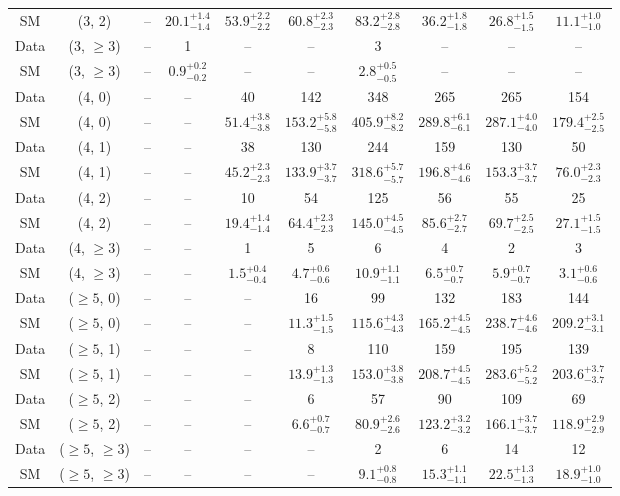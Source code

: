 \begin{table}[h!]
{\begin{tabular}{cccccccccc}
	SM & (3, 2) & -- & $20.1^{+ 1.4 }_{- 1.4 }$ & $53.9^{+ 2.2 }_{- 2.2 }$ & $60.8^{+ 2.3 }_{- 2.3 }$ & $83.2^{+ 2.8 }_{- 2.8 }$ & $36.2^{+ 1.8 }_{- 1.8 }$ & $26.8^{+ 1.5 }_{- 1.5 }$ & $11.1^{+ 1.0 }_{- 1.0 }$ \\[0.5ex] 
	Data & (3, $\ge3$) & -- & 1 & -- & -- & 3 & -- & -- & -- \\[0.5ex] 
	SM & (3, $\ge3$) & -- & $0.9^{+ 0.2 }_{- 0.2 }$ & -- & -- & $2.8^{+ 0.5 }_{- 0.5 }$ & -- & -- & -- \\[0.5ex] 
	Data & (4, 0) & -- & -- & 40 & 142 & 348 & 265 & 265 & 154 \\[0.5ex] 
	SM & (4, 0) & -- & -- & $51.4^{+ 3.8 }_{- 3.8 }$ & $153.2^{+ 5.8 }_{- 5.8 }$ & $405.9^{+ 8.2 }_{- 8.2 }$ & $289.8^{+ 6.1 }_{- 6.1 }$ & $287.1^{+ 4.0 }_{- 4.0 }$ & $179.4^{+ 2.5 }_{- 2.5 }$ \\[0.5ex] 
	Data & (4, 1) & -- & -- & 38 & 130 & 244 & 159 & 130 & 50 \\[0.5ex] 
	SM & (4, 1) & -- & -- & $45.2^{+ 2.3 }_{- 2.3 }$ & $133.9^{+ 3.7 }_{- 3.7 }$ & $318.6^{+ 5.7 }_{- 5.7 }$ & $196.8^{+ 4.6 }_{- 4.6 }$ & $153.3^{+ 3.7 }_{- 3.7 }$ & $76.0^{+ 2.3 }_{- 2.3 }$ \\[0.5ex] 
	Data & (4, 2) & -- & -- & 10 & 54 & 125 & 56 & 55 & 25 \\[0.5ex] 
	SM & (4, 2) & -- & -- & $19.4^{+ 1.4 }_{- 1.4 }$ & $64.4^{+ 2.3 }_{- 2.3 }$ & $145.0^{+ 4.5 }_{- 4.5 }$ & $85.6^{+ 2.7 }_{- 2.7 }$ & $69.7^{+ 2.5 }_{- 2.5 }$ & $27.1^{+ 1.5 }_{- 1.5 }$ \\[0.5ex] 
	Data & (4, $\ge3$) & -- & -- & 1 & 5 & 6 & 4 & 2 & 3 \\[0.5ex] 
	SM & (4, $\ge3$) & -- & -- & $1.5^{+ 0.4 }_{- 0.4 }$ & $4.7^{+ 0.6 }_{- 0.6 }$ & $10.9^{+ 1.1 }_{- 1.1 }$ & $6.5^{+ 0.7 }_{- 0.7 }$ & $5.9^{+ 0.7 }_{- 0.7 }$ & $3.1^{+ 0.6 }_{- 0.6 }$ \\[0.5ex] 
	Data & ($\ge5$, 0) & -- & -- & -- & 16 & 99 & 132 & 183 & 144 \\[0.5ex] 
	SM & ($\ge5$, 0) & -- & -- & -- & $11.3^{+ 1.5 }_{- 1.5 }$ & $115.6^{+ 4.3 }_{- 4.3 }$ & $165.2^{+ 4.5 }_{- 4.5 }$ & $238.7^{+ 4.6 }_{- 4.6 }$ & $209.2^{+ 3.1 }_{- 3.1 }$ \\[0.5ex] 
	Data & ($\ge5$, 1) & -- & -- & -- & 8 & 110 & 159 & 195 & 139 \\[0.5ex] 
	SM & ($\ge5$, 1) & -- & -- & -- & $13.9^{+ 1.3 }_{- 1.3 }$ & $153.0^{+ 3.8 }_{- 3.8 }$ & $208.7^{+ 4.5 }_{- 4.5 }$ & $283.6^{+ 5.2 }_{- 5.2 }$ & $203.6^{+ 3.7 }_{- 3.7 }$ \\[0.5ex] 
	Data & ($\ge5$, 2) & -- & -- & -- & 6 & 57 & 90 & 109 & 69 \\[0.5ex] 
	SM & ($\ge5$, 2) & -- & -- & -- & $6.6^{+ 0.7 }_{- 0.7 }$ & $80.9^{+ 2.6 }_{- 2.6 }$ & $123.2^{+ 3.2 }_{- 3.2 }$ & $166.1^{+ 3.7 }_{- 3.7 }$ & $118.9^{+ 2.9 }_{- 2.9 }$ \\[0.5ex] 
	Data & ($\ge5$, $\ge3$) & -- & -- & -- & -- & 2 & 6 & 14 & 12 \\[0.5ex] 
	SM & ($\ge5$, $\ge3$) & -- & -- & -- & -- & $9.1^{+ 0.8 }_{- 0.8 }$ & $15.3^{+ 1.1 }_{- 1.1 }$ & $22.5^{+ 1.3 }_{- 1.3 }$ & $18.9^{+ 1.0 }_{- 1.0 }$ \\[0.5ex] 
	\hline
	\hline
\end{tabular}}
\end{table}

